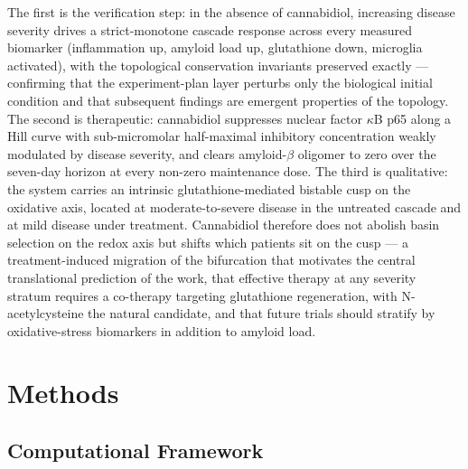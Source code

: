 \documentclass[10pt,letterpaper]{article}
\begin{document}
The first is the verification step: in the absence of cannabidiol, increasing disease severity drives a strict-monotone cascade response across every measured biomarker (inflammation up, amyloid load up, glutathione down, microglia activated), with the topological conservation invariants preserved exactly --- confirming that the experiment-plan layer perturbs only the biological initial condition and that subsequent findings are emergent properties of the topology. The second is therapeutic: cannabidiol suppresses nuclear factor $\kappa$B p65 along a Hill curve with sub-micromolar half-maximal inhibitory concentration weakly modulated by disease severity, and clears amyloid-$\beta$ oligomer to zero over the seven-day horizon at every non-zero maintenance dose. The third is qualitative: the system carries an intrinsic glutathione-mediated bistable cusp on the oxidative axis, located at moderate-to-severe disease in the untreated cascade and at mild disease under treatment. Cannabidiol therefore does not abolish basin selection on the redox axis but shifts which patients sit on the cusp --- a treatment-induced migration of the bifurcation that motivates the central translational prediction of the work, that effective therapy at any severity stratum requires a co-therapy targeting glutathione regeneration, with N-acetylcysteine the natural candidate, and that future trials should stratify by oxidative-stress biomarkers in addition to amyloid load.

\section{Methods}
\label{sec:methods}

\subsection{Computational Framework}
\end{document}

